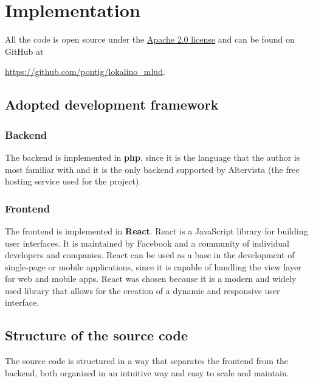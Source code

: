 \chapter{Implementation}

All the code is open source under the \href{https://www.apache.org/licenses/LICENSE-2.0}{Apache 2.0 license} and can be found on GitHub at

\begin{center}
    \url{https://github.com/pontig/lokalino_mlud}.
\end{center}

\section{Adopted development framework}

\subsection*{Backend}

The backend is implemented in \textbf{php}, since it is the language that the author is most familiar with and it is the only backend supported by Altervista (the free hosting service used for the project).

\subsection*{Frontend}

The frontend is implemented in \textbf{React}. React is a JavaScript library for building user interfaces. It is maintained by Facebook and a community of individual developers and companies. React can be used as a base in the development of single-page or mobile applications, since it is capable of handling the view layer for web and mobile apps. React was chosen because it is a modern and widely used library that allows for the creation of a dynamic and responsive user interface.

\section{Structure of the source code}
The source code is structured in a way that separates the frontend from the backend, both organized in an intuitive way and easy to scale and maintain.

